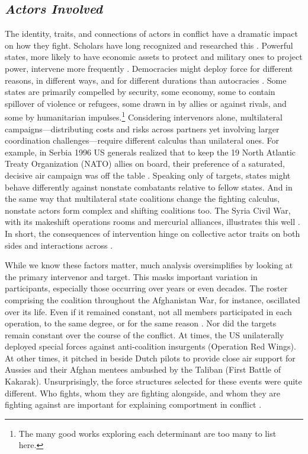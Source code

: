 \documentclass[fleqn,12pt]{article}
\begin{document}
\subsection*{\textit{Actors Involved}}
The identity, traits, and connections of actors in conflict have a dramatic impact on how they fight. Scholars have long recognized and researched this \citep{Huth98}. Powerful states, more likely to have economic assets to protect and military ones to project power, intervene more frequently \citep{SullivanKoch09}. Democracies might deploy force for different reasons, in different ways, and for different durations than autocracies \citep{Caverley14, Talmadge16}. Some states are primarily compelled by security, some economy, some to contain spillover of violence or refugees, some drawn in by allies or against rivals, and some by humanitarian impulses.\footnote{The many good works exploring each determinant are too many to list here.} Considering intervenors alone, multilateral campaigns—distributing costs and risks across partners yet involving larger coordination challenges—require different calculus than unilateral ones. For example, in Serbia 1996 US generals realized that to keep the 19 North Atlantic Treaty Organization (NATO) allies on board, their preference of a saturated, decisive air campaign was off the table \citep{Cooper01}. Speaking only of targets, states might behave differently against nonstate combatants relative to fellow states. And in the same way that multilateral state coalitions change the fighting calculus, nonstate actors form complex and shifting coalitions too. The Syria Civil War, with its makeshift operations rooms and mercurial alliances, illustrates this well \citep{CranmerMenninga18}. In short, the consequences of intervention hinge on collective actor traits on both sides and interactions across \citep{CarmentRowlands98, Caverley09}.

While we know these factors matter, much analysis oversimplifies by looking at the primary intervenor and target. This masks important variation in participants, especially those occurring over years or even decades. The roster comprising the coalition throughout the Afghanistan War, for instance, oscillated over its life. Even if it remained constant, not all members participated in each operation, to the same degree, or for the same reason \citep{GannonKent21}. Nor did the targets remain constant over the course of the conflict. At times, the US unilaterally deployed special forces against anti-coalition insurgents (Operation Red Wings). At other times, it pitched in beside Dutch pilots to provide close air support for Aussies and their Afghan mentees ambushed by the Taliban (First Battle of Kakarak). Unsurprisingly, the force structures selected for these events were quite different. Who fights, whom they are fighting alongside, and whom they are fighting against are important for explaining comportment in conflict \citep{CZGrayer22}. 
\end{document}

